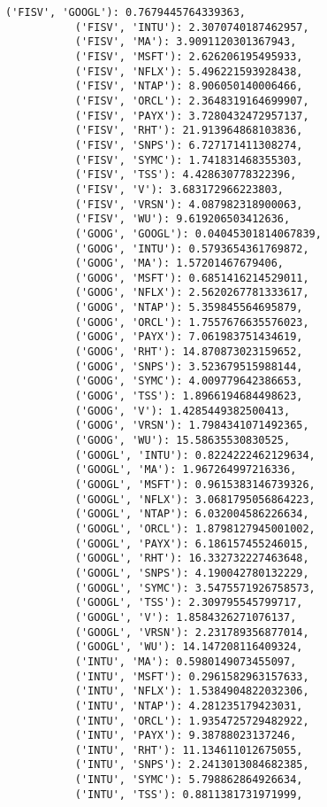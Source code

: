 \documentclass[11pt]{article}
\begin{document}
\begin{Verbatim}[commandchars=\\\{\}]
           ('FISV', 'GOOGL'): 0.7679445764339363,
           ('FISV', 'INTU'): 2.3070740187462957,
           ('FISV', 'MA'): 3.9091120301367943,
           ('FISV', 'MSFT'): 2.626206195495933,
           ('FISV', 'NFLX'): 5.496221593928438,
           ('FISV', 'NTAP'): 8.906050140006466,
           ('FISV', 'ORCL'): 2.3648319164699907,
           ('FISV', 'PAYX'): 3.7280432472957137,
           ('FISV', 'RHT'): 21.913964868103836,
           ('FISV', 'SNPS'): 6.727171411308274,
           ('FISV', 'SYMC'): 1.741831468355303,
           ('FISV', 'TSS'): 4.428630778322396,
           ('FISV', 'V'): 3.683172966223803,
           ('FISV', 'VRSN'): 4.087982318900063,
           ('FISV', 'WU'): 9.619206503412636,
           ('GOOG', 'GOOGL'): 0.04045301814067839,
           ('GOOG', 'INTU'): 0.5793654361769872,
           ('GOOG', 'MA'): 1.57201467679406,
           ('GOOG', 'MSFT'): 0.6851416214529011,
           ('GOOG', 'NFLX'): 2.5620267781333617,
           ('GOOG', 'NTAP'): 5.359845564695879,
           ('GOOG', 'ORCL'): 1.7557676635576023,
           ('GOOG', 'PAYX'): 7.061983751434619,
           ('GOOG', 'RHT'): 14.870873023159652,
           ('GOOG', 'SNPS'): 3.523679515988144,
           ('GOOG', 'SYMC'): 4.009779642386653,
           ('GOOG', 'TSS'): 1.8966194684498623,
           ('GOOG', 'V'): 1.4285449382500413,
           ('GOOG', 'VRSN'): 1.7984341071492365,
           ('GOOG', 'WU'): 15.58635530830525,
           ('GOOGL', 'INTU'): 0.8224222462129634,
           ('GOOGL', 'MA'): 1.967264997216336,
           ('GOOGL', 'MSFT'): 0.9615383146739326,
           ('GOOGL', 'NFLX'): 3.0681795056864223,
           ('GOOGL', 'NTAP'): 6.032004586226634,
           ('GOOGL', 'ORCL'): 1.8798127945001002,
           ('GOOGL', 'PAYX'): 6.186157455246015,
           ('GOOGL', 'RHT'): 16.332732227463648,
           ('GOOGL', 'SNPS'): 4.190042780132229,
           ('GOOGL', 'SYMC'): 3.5475571926758573,
           ('GOOGL', 'TSS'): 2.309795545799717,
           ('GOOGL', 'V'): 1.8584326271076137,
           ('GOOGL', 'VRSN'): 2.231789356877014,
           ('GOOGL', 'WU'): 14.147208116409324,
           ('INTU', 'MA'): 0.5980149073455097,
           ('INTU', 'MSFT'): 0.2961582963157633,
           ('INTU', 'NFLX'): 1.5384904822032306,
           ('INTU', 'NTAP'): 4.281235179423031,
           ('INTU', 'ORCL'): 1.9354725729482922,
           ('INTU', 'PAYX'): 9.38788023137246,
           ('INTU', 'RHT'): 11.134611012675055,
           ('INTU', 'SNPS'): 2.2413013084682385,
           ('INTU', 'SYMC'): 5.798862864926634,
           ('INTU', 'TSS'): 0.8811381731971999,

\end{Verbatim}
\end{document}
